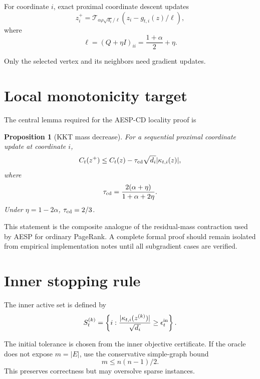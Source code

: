 \documentclass[11pt]{article}
\newtheorem{proposition}{Proposition}
\begin{document}
For coordinate $i$, exact proximal coordinate descent updates
\begin{equation}
z_i^+=\mathcal T_{\alpha\rho\sqrt{d_i}/\ell}(z_i-g_{t,i}(z)/\ell),
\end{equation}
where
\begin{equation}
\ell=(Q+\eta I)_{ii}=\frac{1+\alpha}{2}+\eta.
\end{equation}

Only the selected vertex and its neighbors need gradient updates.

\section{Local monotonicity target}

The central lemma required for the AESP-CD locality proof is
\begin{proposition}[KKT mass decrease]
For a sequential proximal coordinate update at coordinate $i$,
\begin{equation}
C_t(z^+)\leq C_t(z)-\tau_{\rm cd}\sqrt{d_i}|\kappa_{t,i}(z)|,
\end{equation}
where
\begin{equation}
\tau_{\rm cd}=\frac{2(\alpha+\eta)}{1+\alpha+2\eta}.
\end{equation}
Under $\eta=1-2\alpha$, $\tau_{\rm cd}=2/3$.
\end{proposition}

This statement is the composite analogue of the residual-mass contraction used by AESP for ordinary PageRank. A complete formal proof should remain isolated from empirical implementation notes until all subgradient cases are verified.

\section{Inner stopping rule}

The inner active set is defined by
\begin{equation}
S_t^{(k)}=\left\{i:\frac{|\kappa_{t,i}(z^{(k)})|}{\sqrt{d_i}}\geq \epsilon_t^{\rm in}\right\}.
\end{equation}

The initial tolerance is chosen from the inner objective certificate. If the oracle does not expose $m=|E|$, use the conservative simple-graph bound
\begin{equation}
m\leq n(n-1)/2.
\end{equation}
This preserves correctness but may oversolve sparse instances.
\end{document}
